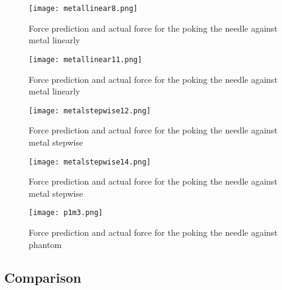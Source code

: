 \begin{figure}
    \centering
    \texttt{[image: metallinear8.png]}
    \caption{Force prediction and actual force for the poking the needle against metal linearly}
    \label{fig:metallinear8}
\end{figure}


\begin{figure}
    \centering
    \texttt{[image: metallinear11.png]}
    \caption{Force prediction and actual force for the poking the needle against metal linearly}
    \label{fig:metallinear11}
\end{figure}

\begin{figure}
    \centering
    \texttt{[image: metalstepwise12.png]}
    \caption{Force prediction and actual force for the poking the needle against metal stepwise}
    \label{fig:metalstepwise12}
\end{figure}

\begin{figure}
    \centering
    \texttt{[image: metalstepwise14.png]}
    \caption{Force prediction and actual force for the poking the needle against metal stepwise}
    \label{fig:metalstepwise14}
\end{figure}

\begin{figure}
    \centering
    \texttt{[image: p1m3.png]}
    \caption{Force prediction and actual force for the poking the needle against phantom}
    \label{fig:Phantom}
\end{figure}
      
      
      
\subsection{Comparison}
